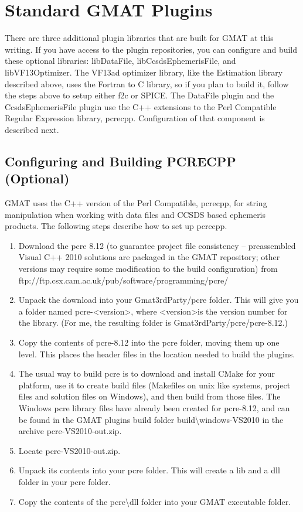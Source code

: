 \documentclass[letterpaper,10pt]{article}%
\begin{document}
\section{\label{sec:Plugins}Standard GMAT Plugins}

There are three additional plugin libraries that are built for GMAT at this writing.  If you have access to the plugin repositories, you can configure and build these optional libraries: libDataFile, libCcsdsEphemerisFile, and libVF13Optimizer.  The VF13ad optimizer library, like the Estimation library described above, uses the Fortran to C library, so if you plan to build it, follow the steps above to setup either f2c or SPICE.  The DataFile plugin and the CcsdsEphemerisFile plugin use the C++ extensions to the Perl Compatible Regular Expression library, pcrecpp.  Configuration of that component is described next.

\subsection{Configuring and Building PCRECPP (Optional)}

GMAT uses the C++ version of the Perl Compatible, pcrecpp, for string manipulation when working with data files and CCSDS based ephemeris products.  The following steps describe how to set up pcrecpp.

\begin{enumerate}
\item Download the pcre 8.12 (to guarantee project file consistency -- preassembled Visual C++ 2010 solutions are packaged in the GMAT repository; other versions may require some modification to the build configuration) from ftp://ftp.csx.cam.ac.uk/pub/software/programming/pcre/
\item Unpack the download into your Gmat3rdParty/pcre folder.  This will give you a folder named pcre-\textless version\textgreater, where \textless version\textgreater is the version number for the library.  (For me, the resulting folder is Gmat3rdParty/pcre/pcre-8.12.)
\item Copy the contents of pcre-8.12 into the pcre folder, moving them up one level.  This places the header files in the location needed to build the plugins.
\item The usual way to build pcre is to download and install CMake for your platform, use it to create build files (Makefiles on unix like systems, project files and solution files on Windows), and then build from those files. The Windows pcre library files have already been created for pcre-8.12, and can be found in the GMAT plugins build folder build\textbackslash windows-VS2010 in the archive pcre-VS2010-out.zip.
\item Locate pcre-VS2010-out.zip.
\item Unpack its contents into your pcre folder.  This will create a lib and a dll folder in your pcre folder.
\item Copy the contents of the pcre\textbackslash dll folder into your GMAT executable folder.
\end{enumerate}
\end{document}
